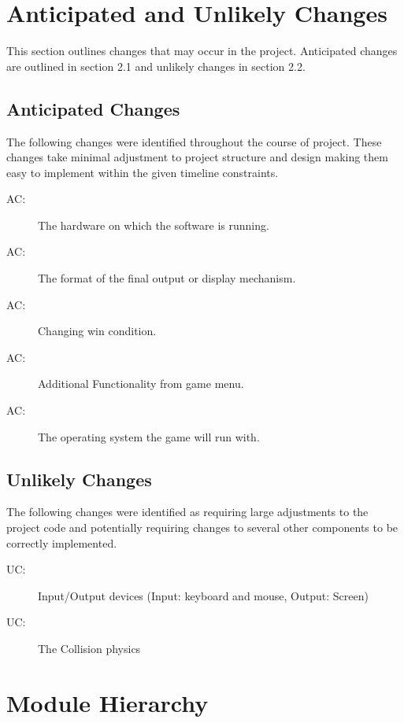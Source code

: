 \documentclass[12pt, titlepage]{article}
\newcounter{acnum}
\newcommand{\actheacnum}{AC\theacnum}
\newcounter{ucnum}
\newcommand{\uctheucnum}{UC\theucnum}
\begin{document}
\section{Anticipated and Unlikely Changes} \label{SecChange}
This section outlines changes that may occur in the project. Anticipated changes are outlined in section 2.1 and unlikely changes in section 2.2.

\subsection{Anticipated Changes} \label{SecAchange}
 The following changes were identified throughout the course of project. These changes take minimal adjustment to project structure and design making them easy to implement within the given timeline constraints. 

\begin{description}
\item[ \actheacnum \label{acHardware}:] The hardware on which the software is running. 
\item[ \actheacnum \label{acInput}:]  The format of the final output or display mechanism.
\item[ \actheacnum \label{acParams}:] Changing win condition. 
\item[ \actheacnum \label{acVerify}:] Additional Functionality from game menu. 
\item[ \actheacnum \label{acOutput}:] The operating system the game will run with. 
\end{description}
\subsection{Unlikely Changes} \label{SecUchange}
The following changes were identified as requiring large adjustments to the project code and potentially requiring changes to several other components to be correctly implemented.

\begin{description}
\item[ \uctheucnum \label{ucIO}:] Input/Output devices (Input: keyboard and mouse, Output: Screen)
\item[ \uctheucnum \label{ucInput}:] The Collision physics
\end{description}
\section{Module Hierarchy} \label{SecMH}
\end{document}
